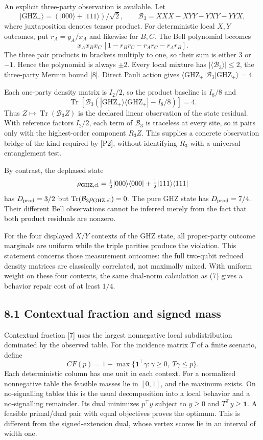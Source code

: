 \documentclass[
]{article}
\begin{document}
An explicit three-party observation is available. Let
\[
|\mathrm{GHZ}_+\rangle=(|000\rangle+|111\rangle)/\sqrt2,
\qquad
\mathcal B_3=XXX-XYY-YXY-YYX,
\]
where juxtaposition denotes tensor product. For deterministic local \(X,Y\) outcomes, put \(r_A=y_A/x_A\) and likewise for \(B,C\). The Bell polynomial becomes
\[
x_Ax_Bx_C\,[1-r_Br_C-r_Ar_C-r_Ar_B].
\]
The three pair products in brackets multiply to one, so their sum is either \(3\) or \(-1\). Hence the polynomial is always \(\pm2\). Every local mixture has \(|\langle\mathcal B_3\rangle|\le2\), the three-party Mermin bound {[}8{]}. Direct Pauli action gives \(\langle\mathrm{GHZ}_+|\mathcal B_3|\mathrm{GHZ}_+\rangle=4\).

Each one-party density matrix is \(I_2/2\), so the product baseline is \(I_8/8\) and
\[
\operatorname{Tr}\!\left[\mathcal B_3
\left(|\mathrm{GHZ}_+\rangle\langle\mathrm{GHZ}_+|-I_8/8\right)\right]=4.
\tag{24}
\]
Thus \(Z\mapsto\operatorname{Tr}(\mathcal B_3Z)\) is the declared linear observation of the state residual. With reference factors \(I_2/2\), each term of \(\mathcal B_3\) is traceless at every site, so it pairs only with the highest-order component \(R_3Z\). This supplies a concrete observation bridge of the kind required by {[}P2{]}, without identifying \(R_3\) with a universal entanglement test.

By contrast, the dephased state
\[
\rho_{\rm GHZ,cl}=\tfrac12|000\rangle\langle000|
                         +\tfrac12|111\rangle\langle111|
\]
has \(D_{\rm prod}=3/2\) but \(\operatorname{Tr}(\mathcal B_3\rho_{\rm GHZ,cl})=0\). The pure GHZ state has \(D_{\rm prod}=7/4\). Their different Bell observations cannot be inferred merely from the fact that both product residuals are nonzero.

For the four displayed \(X/Y\) contexts of the GHZ state, all proper-party outcome marginals are uniform while the triple parities produce the violation. This statement concerns those measurement outcomes: the full two-qubit reduced density matrices are classically correlated, not maximally mixed. With uniform weight on these four contexts, the same dual-norm calculation as (7) gives a behavior repair cost of at least \(1/4\).

\subsection{8.1 Contextual fraction and signed mass}\label{contextual-fraction-and-signed-mass}

Contextual fraction {[}7{]} uses the largest nonnegative local subdistribution dominated by the observed table. For the incidence matrix \(T\) of a finite scenario, define
\[
CF(p)=1-\max\{\mathbf1^\top\gamma:\gamma\ge0,\ T\gamma\le p\}.
\tag{31}
\]
Each deterministic column has one unit in each context. For a normalized nonnegative table the feasible masses lie in \([0,1]\), and the maximum exists. On no-signalling tables this is the usual decomposition into a local behavior and a no-signalling remainder. Its dual minimizes \(p^\top y\) subject to \(y\ge0\) and \(T^\top y\ge\mathbf1\). A feasible primal/dual pair with equal objectives proves the optimum. This is different from the signed-extension dual, whose vertex scores lie in an interval of width one.
\end{document}
